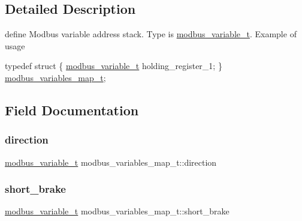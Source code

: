 \subsection{Detailed Description}
define Modbus variable address stack. Type is \mbox{\hyperlink{structmodbus__variable__t}{modbus\+\_\+variable\+\_\+t}}. Example of usage 
\begin{DoxyCode}
\textcolor{keyword}{typedef} \textcolor{keyword}{struct }\{
   \mbox{\hyperlink{structmodbus__variable__t}{modbus\_variable\_t}} holding\_register\_1;
\} \mbox{\hyperlink{structmodbus__variables__map__t}{modbus\_variables\_map\_t}};
\end{DoxyCode}
 

\subsection{Field Documentation}
\mbox{\label{structmodbus__variables__map__t_a43804420cb4ea833a33787203dbda708}} 
\subsubsection{\texorpdfstring{direction}{direction}}
{\footnotesize\ttfamily \mbox{\hyperlink{structmodbus__variable__t}{modbus\+\_\+variable\+\_\+t}} modbus\+\_\+variables\+\_\+map\+\_\+t\+::direction}

\mbox{\label{structmodbus__variables__map__t_a4900eb2be91da62d0f8e1c8834f3f728}} 
\subsubsection{\texorpdfstring{short\+\_\+brake}{short\_brake}}
{\footnotesize\ttfamily \mbox{\hyperlink{structmodbus__variable__t}{modbus\+\_\+variable\+\_\+t}} modbus\+\_\+variables\+\_\+map\+\_\+t\+::short\+\_\+brake}

\mbox{\label{structmodbus__variables__map__t_ac9404c6a1ee54faa3026cb67df31d228}} 
